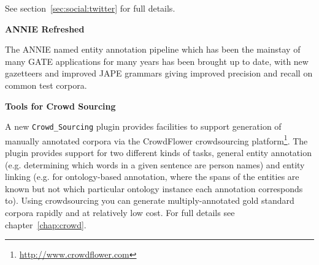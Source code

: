 See section~\ref{sec:social:twitter} for full details.

\textbf{ANNIE Refreshed}

The ANNIE named entity annotation pipeline which has been the mainstay of many
GATE applications for many years has been brought up to date, with new
gazetteers and improved JAPE grammars giving improved precision and recall on
common test corpora.

\textbf{Tools for Crowd Sourcing}

A new \verb!Crowd_Sourcing! plugin provides facilities to support generation of
manually annotated corpora via the CrowdFlower crowdsourcing
platform\footnote{\url{http://www.crowdflower.com}}.  The plugin provides
support for two different kinds of tasks, general entity annotation (e.g.
determining which words in a given sentence are person names) and entity
linking (e.g. for ontology-based annotation, where the spans of the entities
are known but not which particular ontology instance each annotation
corresponds to).  Using crowdsourcing you can generate multiply-annotated gold
standard corpora rapidly and at relatively low cost.  For full details see
chapter~\ref{chap:crowd}.


